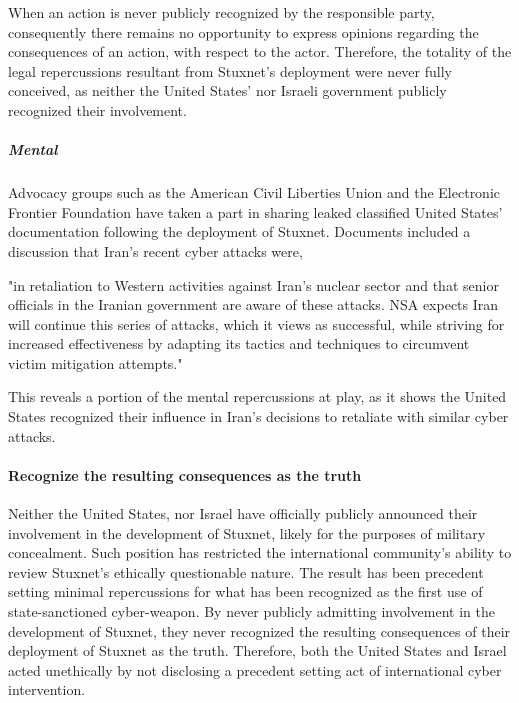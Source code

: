 \documentclass[12pt]{article}
\begin{document}
\begin{multicols}{2}
When an action is never publicly recognized by the responsible party, consequently there remains no opportunity to express opinions regarding the consequences of an action, with respect to the actor. Therefore, the totality of the legal repercussions resultant from Stuxnet's deployment were never fully conceived, as neither the United States' nor Israeli government publicly recognized their involvement.

\subparagraph{Mental}

Advocacy groups such as the American Civil Liberties Union and the Electronic Frontier Foundation have taken a part in sharing leaked classified United States' documentation following the deployment of Stuxnet. Documents included a discussion that Iran's recent cyber attacks were, 

\begin{displayquote}
"in retaliation to Western activities against Iran's nuclear sector and that senior officials in the Iranian government are aware of these attacks. NSA expects Iran will continue this series of attacks, which it views as successful, while striving for increased effectiveness by adapting its tactics and techniques to circumvent victim mitigation attempts."\cite{effForwardsIranDiscussion}\cite{acluForwardsIranDiscussion}
\end{displayquote}

This reveals a portion of the mental repercussions at play, as it shows the United States recognized their influence in Iran's decisions to retaliate with similar cyber attacks.  

\paragraph{Recognize the resulting consequences as the truth}

Neither the United States, nor Israel have officially publicly announced their involvement in the development of Stuxnet, likely for the purposes of military concealment. Such position has restricted the international community's ability to review Stuxnet's ethically questionable nature. The result has been precedent setting minimal repercussions for what has been recognized as the first use of state-sanctioned cyber-weapon. By never publicly admitting involvement in the development of Stuxnet, they never recognized the resulting consequences of their deployment of Stuxnet as the truth. Therefore, both the United States and Israel acted unethically by not disclosing a precedent setting act of international cyber intervention.


\end{multicols}
\end{document}

